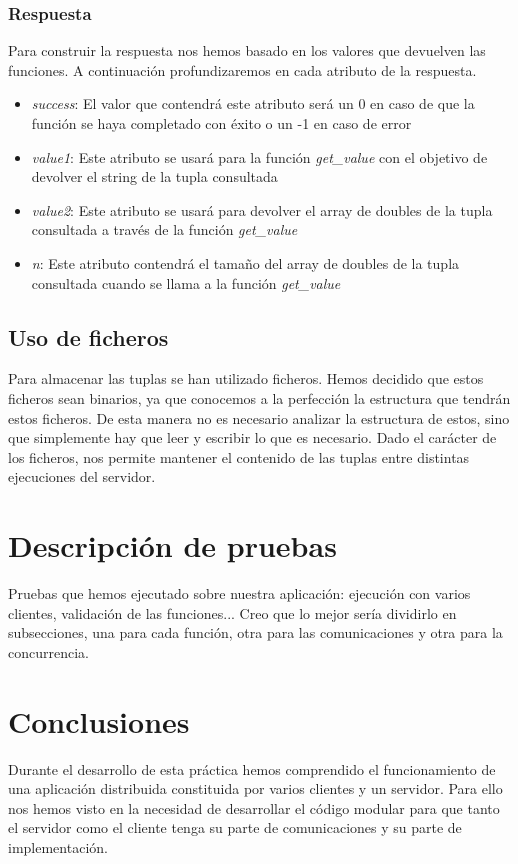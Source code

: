 \documentclass[]{article}
\begin{document}
\subsubsection{Respuesta}
\label{subsec::respuesta}
Para construir la respuesta nos hemos basado en los valores que devuelven las funciones. A continuación profundizaremos en cada atributo de la respuesta.

\begin{itemize}
  \item \textit{success}: El valor que contendrá este atributo será un 0 en caso de que la función se haya completado con éxito o un -1 en caso de error
  \item \textit{value1}: Este atributo se usará para la función \textit{get\_value} con el objetivo de devolver el string de la tupla consultada
  \item \textit{value2}: Este atributo se usará para devolver el array de doubles de la tupla consultada a través de la función \textit{get\_value}
  \item \textit{n}: Este atributo contendrá el tamaño del array de doubles de la tupla consultada cuando se llama a la función \textit{get\_value}
\end{itemize}

\subsection{Uso de ficheros}
\label{subsec:uso_de_ficheros}
Para almacenar las tuplas se han utilizado ficheros. Hemos decidido que estos ficheros sean binarios, ya que conocemos a la perfección la estructura que tendrán estos ficheros.
De esta manera no es necesario analizar la estructura de estos, sino que simplemente hay que leer y escribir lo que es necesario.
Dado el carácter de los ficheros, nos permite mantener el contenido de las tuplas entre distintas ejecuciones del servidor. 


\section{Descripción de pruebas}
\label{sec:descripcion_de_pruebas}
Pruebas que hemos ejecutado sobre nuestra aplicación: ejecución con varios clientes, validación de las funciones... Creo que lo mejor sería dividirlo en subsecciones, una para cada función, otra para las comunicaciones y otra para la concurrencia. 

\section{Conclusiones}
\label{sec:conclusiones}
Durante el desarrollo de esta práctica hemos comprendido el funcionamiento de una aplicación distribuida constituida por varios clientes y un servidor.
Para ello nos hemos visto en la necesidad de desarrollar el código modular para que tanto el servidor como el cliente tenga su parte de comunicaciones y su parte de implementación.
\end{document}
